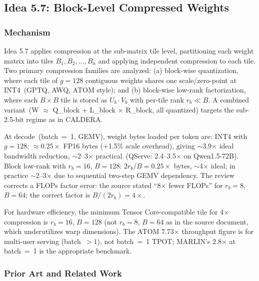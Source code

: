 \documentclass[11pt]{article}
\begin{document}

\subsection{Idea 5.7: Block-Level Compressed Weights}
\label{subsec:idea57}

\subsubsection*{Mechanism}

Idea 5.7 applies compression at the sub-matrix tile level, partitioning each weight matrix into tiles $B_1, B_2, \ldots, B_n$ and applying independent compression to each tile. Two primary compression families are analyzed: (a) block-wise quantization, where each tile of $g{=}128$ contiguous weights shares one scale/zero-point at INT4~(GPTQ, AWQ, ATOM style); and (b) block-wise low-rank factorization, where each $B{\times}B$ tile is stored as $U_b \cdot V_b$ with per-tile rank $r_b \ll B$. A combined variant~(W $\approx$ Q\_block + L\_block $\times$ R\_block, all quantized) targets the sub-2.5-bit regime as in CALDERA.

At decode~(batch~=~1, GEMV), weight bytes loaded per token are: INT4 with $g{=}128$: $\approx 0.25\times$ FP16 bytes ($+$1.5\% scale overhead), giving $\sim$3.9$\times$ ideal bandwidth reduction, $\sim$2--3$\times$ practical~(QServe: 2.4--3.5$\times$ on Qwen1.5-72B). Block low-rank with $r_b{=}16$, $B{=}128$: $2r_b/B {=} 0.25\times$ bytes, $\sim$4$\times$ ideal; in practice $\sim$2--3$\times$ due to sequential two-step GEMV dependency. The review corrects a FLOPs factor error: the source stated ``8$\times$ fewer FLOPs'' for $r_b{=}8$, $B{=}64$; the correct factor is $B/(2r_b) {=} 4\times$.

For hardware efficiency, the minimum Tensor Core-compatible tile for 4$\times$ compression is $r_b{=}16$, $B{=}128$ (not $r_b{=}8$, $B{=}64$ as in the source document, which underutilizes warp dimensions). The ATOM 7.73$\times$ throughput figure is for multi-user serving (batch~$> 1$), not batch~=~1 TPOT; MARLIN's 2.8$\times$ at batch~=~1 is the appropriate benchmark.

\subsubsection*{Prior Art and Related Work}
\end{document}
